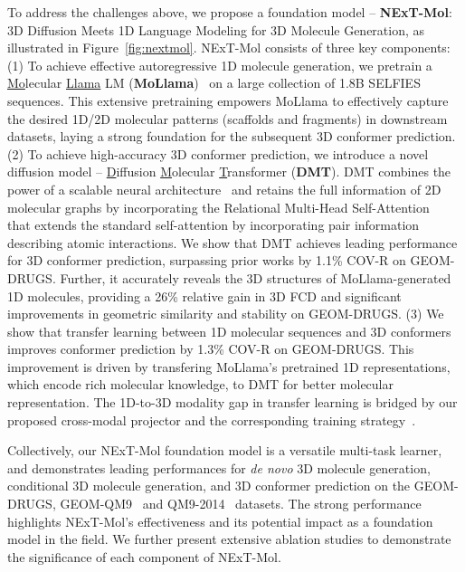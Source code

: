To address the challenges above, we propose a foundation model -- \textbf{NExT-Mol}: 3D Diffusion Meets 1D Language Modeling for 3D Molecule Generation, as illustrated in Figure~\ref{fig:nextmol}. NExT-Mol consists of three key components: (1) To achieve effective autoregressive 1D molecule generation, we pretrain a \underline{Mo}lecular \underline{Llama} LM (\textbf{MoLlama})~\citep{Llama-2,TinyLlama} on a large collection of 1.8B SELFIES sequences. 
This extensive pretraining empowers MoLlama to effectively capture the desired 1D/2D molecular patterns (\eg scaffolds and fragments) in downstream datasets, laying a strong foundation for the subsequent 3D conformer prediction.
(2) To achieve high-accuracy 3D conformer prediction, we introduce a novel diffusion model -- \underline{D}iffusion \underline{M}olecular \underline{T}ransformer (\textbf{DMT}). DMT combines the power of a scalable neural architecture~\citep{MCF} and retains the full information of 2D molecular graphs by incorporating the Relational Multi-Head Self-Attention~\citep{JODO} that extends the standard self-attention by incorporating pair information describing atomic interactions.
We show that DMT achieves leading performance for 3D conformer prediction, surpassing prior works by 1.1\% COV-R on GEOM-DRUGS. Further, it accurately reveals the 3D structures of MoLlama-generated 1D molecules, providing a 26\% relative gain in 3D FCD and significant improvements in geometric similarity and stability on GEOM-DRUGS. (3) We show that transfer learning between 1D molecular sequences and 3D conformers improves conformer prediction by 1.3\% COV-R on GEOM-DRUGS. This improvement is driven by transfering MoLlama's pretrained 1D representations, which encode rich molecular knowledge, to DMT for better molecular representation. The 1D-to-3D modality gap in transfer learning is bridged by our proposed cross-modal projector and the corresponding training strategy~\citep{llava}.


Collectively, our NExT-Mol foundation model is a versatile multi-task learner, and demonstrates leading performances for \textit{de novo} 3D molecule generation, conditional 3D molecule generation, and 3D conformer prediction on the GEOM-DRUGS, GEOM-QM9~\citep{GEOM} and QM9-2014~\citep{QM9} datasets. 
The strong performance highlights NExT-Mol's effectiveness and its potential impact as a foundation model in the field. We further present extensive ablation studies to demonstrate the significance of each component of NExT-Mol.

